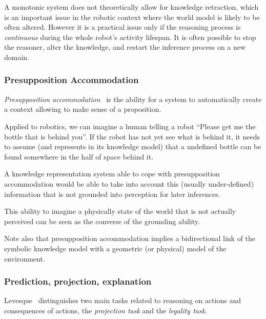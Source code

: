 A monotonic system does not theoretically allow for knowledge retraction,
which is an important issue in the robotic context where the world model is
likely to be often altered.  However it is a practical issue only if the
reasoning process is \emph{continuous} during the whole robot's activity
lifespan. It is often possible to stop the reasoner, alter the knowledge, and
restart the inference process on a new domain.



\subsubsection{Presupposition Accommodation}
\label{sect|presupposition-accommodation}

\emph{Presupposition accommodation}~\cite{VonFintel2008} is the ability for a
system to automatically create a context allowing to make sense of a
proposition.

Applied to robotics, we can imagine a human telling a robot ``Please get me the
bottle that is behind you''. If the robot has not yet see what is behind it, it
needs to assume (and represents in its knowledge model) that a undefined bottle
can be found somewhere in the half of space behind it.

A knowledge representation system able to cope with presupposition
accommodation would be able to take into account this (usually under-defined)
information that is not grounded into perception for later inferences.

This ability to imagine a physically state of the world that is not actually
perceived can be seen as the converse of the grounding ability.

Note also that presupposition accommodation implies a bidirectional link of the
symbolic knowledge model with a geometric (or physical) model of the
environment.

\subsubsection{Prediction, projection, explanation}
\label{sect|prediction-projection}

Levesque~\cite{Levesque2008} distinguishes two main tasks related to reasoning
on actions and consequences of actions, the \emph{projection task} and the
\emph{legality task}.

